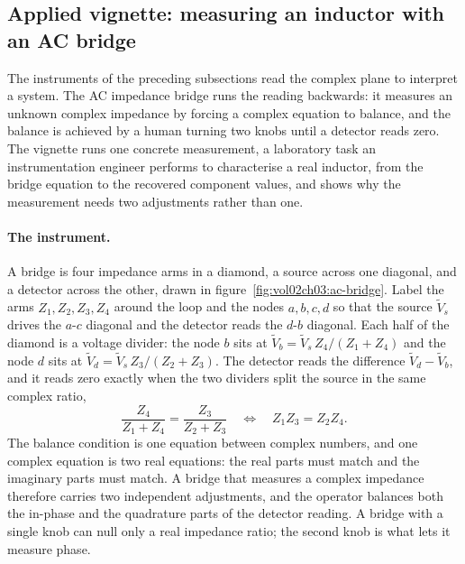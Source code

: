 

\subsection{Applied vignette: measuring an inductor with an AC bridge}

The instruments of the preceding subsections read the complex plane to
interpret a system. The AC impedance bridge runs the reading backwards:
it measures an unknown complex impedance by forcing a complex equation
to balance, and the balance is achieved by a human turning two knobs
until a detector reads zero. The vignette runs one concrete
measurement, a laboratory task an instrumentation engineer performs to
characterise a real inductor, from the bridge equation to the recovered
component values, and shows why the measurement needs two adjustments
rather than one.

\paragraph{The instrument.} A bridge is four impedance arms in a
diamond, a source across one diagonal, and a detector across the other,
drawn in figure~\ref{fig:vol02ch03:ac-bridge}. Label the arms $Z_1,
Z_2, Z_3, Z_4$ around the loop and the nodes $a, b, c, d$ so that the
source $\tilde V_s$ drives the $a$-$c$ diagonal and the detector reads
the $d$-$b$ diagonal. Each half of the diamond is a voltage divider:
the node $b$ sits at $\tilde V_b = \tilde V_s\,Z_4/(Z_1 + Z_4)$ and the
node $d$ sits at $\tilde V_d = \tilde V_s\,Z_3/(Z_2 + Z_3)$. The
detector reads the difference $\tilde V_d - \tilde V_b$, and it reads
zero exactly when the two dividers split the source in the same complex
ratio,
\[
\frac{Z_4}{Z_1 + Z_4} = \frac{Z_3}{Z_2 + Z_3}
\quad\Longleftrightarrow\quad
Z_1 Z_3 = Z_2 Z_4.
\]
The balance condition is one equation between complex numbers, and one
complex equation is two real equations: the real parts must match and
the imaginary parts must match. A bridge that measures a complex
impedance therefore carries two independent adjustments, and the
operator balances both the in-phase and the quadrature parts of the
detector reading. A bridge with a single knob can null only a real
impedance ratio; the second knob is what lets it measure phase.


